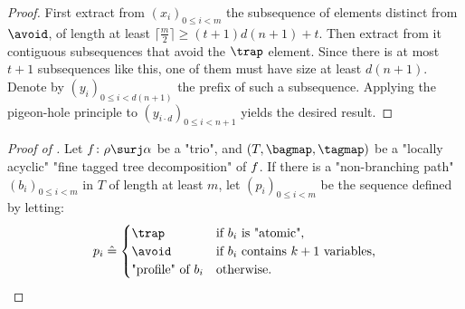 \begin{proof}
    First extract from $(x_i)_{0 \leq i < m}$ the subsequence of elements
    distinct from $\avoid$, of length at least $\lceil\frac{m}{2}\rceil \geq (t+1)d(n+1) + t$.
    Then extract from it contiguous subsequences that avoid
    the $\trap$ element. Since there is at most $t+1$ subsequences like this,
    one of them must have size at least $d(n+1)$. Denote by
    $(y_i)_{0 \leq i < d(n+1)}$ the prefix of such a subsequence.
    Applying the pigeon-hole principle
    to $(y_{i\cdot d})_{0 \leq i < n+1}$ yields the desired result.
\end{proof}

\begin{proof}[Proof of ]
    Let $\fun\colon \rho \surj \alpha$ be a "trio", and $(T, \bagmap, \tagmap)$ be a
    "locally acyclic" "fine tagged tree decomposition" of $f$. If there is a "non-branching path"
    $(b_i)_{0\leq i<m}$ in $T$ of length at least $m$, let $(p_i)_{0 \leq i<m}$ be
    the sequence defined by letting:
    \[
        p_i \defeq \begin{cases}
            \trap & \text{if $b_i$ is "atomic",} \\
            \avoid & \text{if $b_i$ contains $k+1$ variables,} \\
            \text{"profile" of } b_i & \text{otherwise.}
        \end{cases}    
    \]
    

\end{proof}
